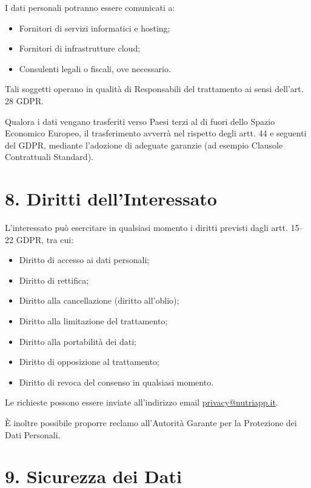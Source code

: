 \documentclass[a4paper,12pt]{article}
\begin{document}
    I dati personali potranno essere comunicati a:

    \begin{itemize}
        \item Fornitori di servizi informatici e hosting;
        \item Fornitori di infrastrutture cloud;
        \item Consulenti legali o fiscali, ove necessario.
    \end{itemize}

    Tali soggetti operano in qualità di Responsabili del trattamento ai sensi dell’art. 28 GDPR.

    Qualora i dati vengano trasferiti verso Paesi terzi al di fuori dello Spazio Economico Europeo, il trasferimento avverrà nel rispetto degli artt. 44 e seguenti del GDPR, mediante l’adozione di adeguate garanzie (ad esempio Clausole Contrattuali Standard).

    \section*{8. Diritti dell’Interessato}

    L’interessato può esercitare in qualsiasi momento i diritti previsti dagli artt. 15–22 GDPR, tra cui:

    \begin{itemize}
        \item Diritto di accesso ai dati personali;
        \item Diritto di rettifica;
        \item Diritto alla cancellazione (diritto all’oblio);
        \item Diritto alla limitazione del trattamento;
        \item Diritto alla portabilità dei dati;
        \item Diritto di opposizione al trattamento;
        \item Diritto di revoca del consenso in qualsiasi momento.
    \end{itemize}

    Le richieste possono essere inviate all’indirizzo email \href{mailto:privacy@nutriapp.it}{privacy@nutriapp.it}.

    È inoltre possibile proporre reclamo all’Autorità Garante per la Protezione dei Dati Personali.

    \section*{9. Sicurezza dei Dati}
\end{document}
